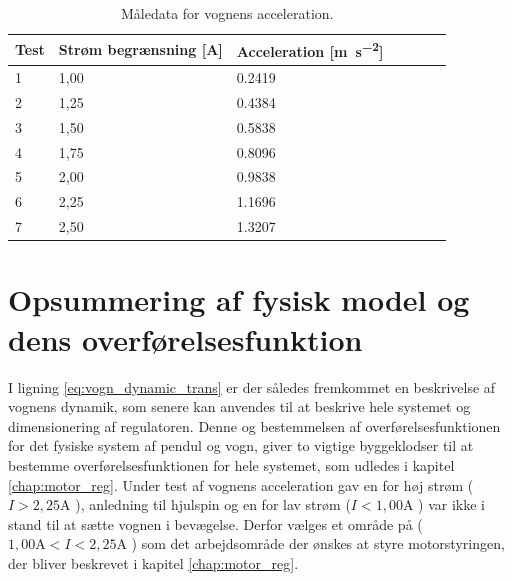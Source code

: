 \begin{table}[h!]
	\small
	\centering
	\caption{Måledata for vognens acceleration.}
	\label{tab:maaldata_vogn}
	\begin{threeparttable}
		\begin{tabular}{ l l l l l l l }
			\toprule
			\multicolumn{1}{l}{\textbf{Test}}       &
			\multicolumn{1}{l}{\textbf{Strøm begrænsning [\si{\ampere}]}}       &
			\multicolumn{1}{l}{\textbf{Acceleration [\si{\meter\per\second\squared}]}}   \\ 
			\hline
			1 &  1,00  &  \num{0.2419}  \\
			2 &  1,25  &  \num{0.4384}  \\
			3 &  1,50  &  \num{0.5838}  \\
			4 &  1,75  &  \num{0.8096}  \\
			5 &  2,00  &  \num{0.9838}  \\
			6 &  2,25  &  \num{1.1696}  \\
			7 &  2,50  &  \num{1.3207}  \\
			\hline
			\bottomrule
		\end{tabular}
	\end{threeparttable}
\end{table} 
\FloatBlock

\section{Opsummering af fysisk model og dens overførelsesfunktion}

I ligning \ref{eq:vogn_dynamic_trans} er der således fremkommet en beskrivelse af vognens dynamik, som senere kan anvendes til at beskrive hele systemet og dimensionering af regulatoren.
Denne og bestemmelsen af overførelsesfunktionen for det fysiske system af pendul og vogn, giver to vigtige byggeklodser til at bestemme overførelsesfunktionen for hele systemet, som udledes i kapitel \ref{chap:motor_reg}.
Under test af vognens acceleration gav en for høj strøm ($I > 2,25 \si{\ampere} $ ), anledning til hjulspin og en for lav strøm ($I < 1,00 \si{\ampere} $ ) var ikke i stand til at sætte vognen i bevægelse.
Derfor vælges et område på ($ 1,00 \si{\ampere} <  I < 2,25 \si{\ampere} $ ) som det arbejdsområde der ønskes at styre motorstyringen, der bliver beskrevet i kapitel \ref{chap:motor_reg}.



 